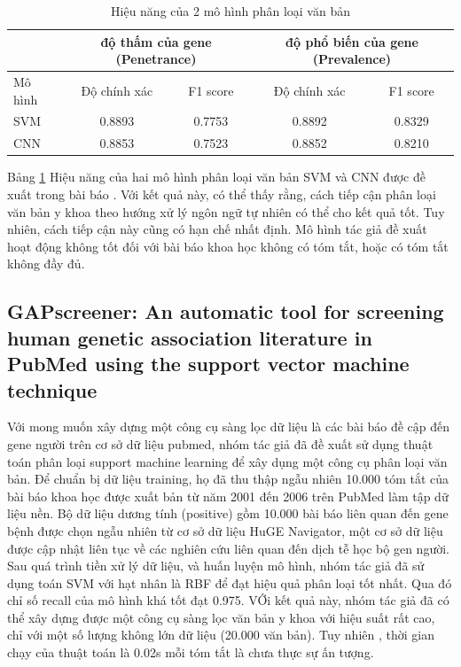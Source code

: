 \documentclass[../DoAn.tex]{subfiles}
\begin{document}
\begin{table}[]
\caption{Hiệu năng của 2 mô hình phân loại văn bản}
\label{tab:svmcnn}
\begin{tabular}{@{}|l|cc|cc|@{}}
\toprule
        & \multicolumn{2}{c|}{độ thấm của gene (Penetrance)} & \multicolumn{2}{c|}{độ phổ biến của gene (Prevalence)} \\ \midrule
Mô hình & \multicolumn{1}{c|}{Độ chính xác}    & F1 score    & \multicolumn{1}{c|}{Độ chính xác}      & F1 score      \\ \midrule
SVM & \multicolumn{1}{c|}{0.8893} & 0.7753 & \multicolumn{1}{c|}{0.8892} & 0.8329 \\ \midrule
CNN & \multicolumn{1}{c|}{0.8853} & 0.7523 & \multicolumn{1}{c|}{0.8852} & 0.8210 \\ \bottomrule
\end{tabular}
\end{table}

Bảng \ref{tab:svmcnn} Hiệu năng của hai mô hình phân loại văn bản SVM và CNN được đề xuất trong bài báo \cite{useML}.
Với kết quả này, có thể thấy rằng, cách tiếp cận phân loại văn bản y khoa theo hướng xử lý ngôn ngữ tự nhiên có thể cho kết quả tốt. Tuy nhiên, cách tiếp cận này cũng có hạn chế nhất định. Mô hình tác giả đề xuất hoạt động không tốt đối với bài báo khoa học không có tóm tắt, hoặc có tóm tắt không đầy đủ.

\subsection{GAPscreener: An automatic tool for screening human genetic association literature in PubMed using the support vector machine technique \cite{GAPscreener}}
Với mong muốn xây dựng một công cụ sàng lọc dữ liệu là các bài báo đề cập đến gene người trên cơ sở dữ liệu pubmed, nhóm tác giả đã đề xuất sử dụng thuật toán phân loại support machine learning để xây dụng một công cụ phân loại văn bản. Để chuẩn bị dữ liệu training, họ đã thu thập ngẫu nhiên 10.000 tóm tắt của bài báo khoa học được xuất bản từ năm 2001 đến 2006 trên PubMed làm tập dữ liệu nền. Bộ dữ liệu dương tính (positive) gồm 10.000 bài báo liên quan đến gene bệnh được chọn
ngẫu nhiên từ cơ sở dữ liệu HuGE Navigator\cite{huge}, một cơ sở dữ liệu được cập nhật liên tục về các nghiên cứu liên quan đến dịch tễ học bộ gen người. Sau quá trình tiền xử lý dữ liệu, và huấn luyện mô hình, nhóm tác giả đã sử dụng toán SVM với hạt nhân là RBF để đạt hiệu quả phân loại tốt nhất. Qua đó chỉ số recall của mô hình khá tốt đạt 0.975. VỚi kết quả này, nhóm tác giả đã có thể xây dựng được một công cụ sàng lọc văn bản y khoa với hiệu suất rất cao, chỉ với một số lượng không lớn dữ liệu (20.000 văn bản). Tuy nhiên , thời gian chạy của thuật toán là 0.02s mỗi tóm tắt là chưa thực sự ấn tượng.
\end{document}
